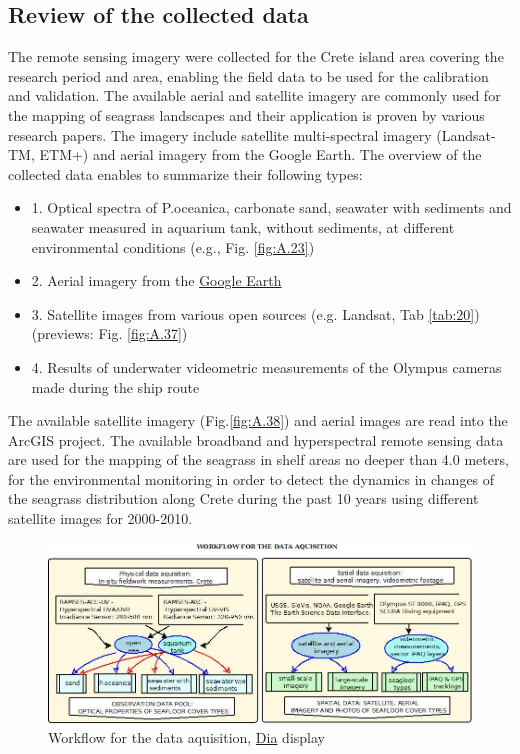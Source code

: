 \documentclass[10pt, a4paper]{article}
\begin{document}
\subsection{Review of the collected data}
The remote sensing imagery were collected for the Crete island area covering the research period and
area, enabling the field data to be used for the calibration and validation. The available aerial and
satellite imagery are commonly used for the mapping of seagrass landscapes and their application is
proven by various research papers. The imagery include satellite multi-spectral imagery (Landsat-TM,
ETM+) and aerial imagery from the Google Earth.
The overview of the collected data enables to summarize their following types:
\begin{itemize}
	\item[] 1. Optical spectra of P.oceanica, carbonate sand, seawater with sediments and seawater measured in aquarium tank, without sediments, at different environmental conditions (e.g., Fig. \ref{fig:A.23})
	\item[]2. Aerial imagery from the \href{http://www.google.com/earth/index.html}{Google Earth}
	\item[]3. Satellite images from various open sources (e.g. Landsat, Tab \ref{tab:20}) (previews: Fig. \ref{fig:A.37})
	\item[]4. Results of underwater videometric measurements of the Olympus cameras made during the ship route
\end{itemize}
The available satellite imagery (Fig.\ref{fig:A.38}) and aerial images are read into the ArcGIS project.
The available broadband and hyperspectral remote sensing data are used for the mapping of the
seagrass in shelf areas no deeper than 4.0 meters, for the environmental monitoring in order to detect
the dynamics in changes of the seagrass distribution along Crete during the past 10 years using
different satellite images for 2000-2010.

\begin{figure}[h]
	\centering
	\includegraphics[scale=0.40]{UML_Dia.jpg}
	\caption{Workflow for the data aquisition, \href{http://live.gnome.org/Dia}{Dia} display}
	\label{fig:24}
\end{figure}
\end{document}
